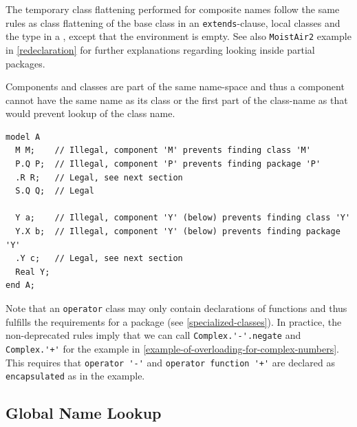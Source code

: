 \begin{nonnormative}
The temporary class flattening performed for composite names follow the same rules as class flattening of the base class in an \lstinline!extends!-clause, local classes and the type in a , except that the environment is empty.
See also \lstinline!MoistAir2! example in \cref{redeclaration} for further explanations regarding looking inside partial packages.
\end{nonnormative}
\begin{example}
Components and classes are part of the same name-space and thus a component cannot have the same name as its class or the first part of the class-name as that would prevent lookup of the class name.
\begin{lstlisting}[language=modelica]
model A
  M M;    // Illegal, component 'M' prevents finding class 'M'
  P.Q P;  // Illegal, component 'P' prevents finding package 'P'
  .R R;   // Legal, see next section
  S.Q Q;  // Legal

  Y a;    // Illegal, component 'Y' (below) prevents finding class 'Y'
  Y.X b;  // Illegal, component 'Y' (below) prevents finding package 'Y'
  .Y c;   // Legal, see next section
  Real Y;
end A;
\end{lstlisting}
\end{example}

\begin{nonnormative}
Note that an \lstinline!operator! class may only contain declarations of functions and thus fulfills the requirements for a package (see \cref{specialized-classes}).
In practice, the non-deprecated rules imply that we can call \lstinline!Complex.'-'.negate! and \lstinline!Complex.'+'! for the example in \cref{example-of-overloading-for-complex-numbers}.
This requires that \lstinline!operator '-'! and \lstinline!operator function '+'! are declared as \lstinline!encapsulated! as in the example.
\end{nonnormative}


\subsection{Global Name Lookup}\label{global-name-lookup}

